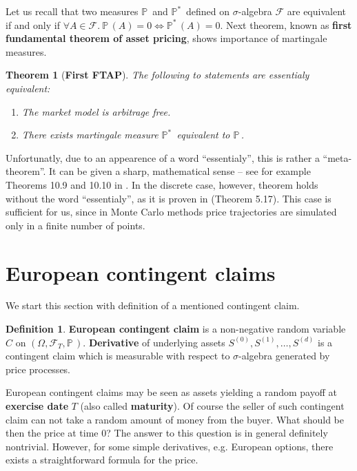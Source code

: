 \documentclass[a4paper,12pt, oneside]{book}
\newtheorem{thm}{Theorem}[chapter]
\theoremstyle{definition}
\newtheorem{mydef}{Definition}[chapter]
\theoremstyle{remark}
\def\P{{\mathbb{P}}\,}
\def\Pm{{\mathbb{P}}^*\,}
\begin{document}
Let us recall that two measures $\P$ and $\Pm$ defined on $\sigma$-algebra $\mathcal{F}$ are equivalent if and only if $\forall A \in \mathcal{F}.\ \P(A)=0 \Leftrightarrow \Pm(A)=0$. Next theorem, known as \textbf{first fundamental theorem of asset pricing}, shows importance of martingale measures.
\begin{thm}[\bfseries First FTAP]
 \label{thm:fftap}
 The following to statements are \emph{essentialy} equivalent:
 \begin{enumerate}
  \item The market model is arbitrage free.
  \item There exists martingale measure $\Pm$ equivalent to $\P$.
 \end{enumerate}
\end{thm}
Unfortunatly, due to an appearence of a word ``essentialy'', this is rather a ``meta-theorem''. It can be given a sharp, mathematical sense -- see for example Theorems 10.9 and 10.10 in \cite{bjork}. In the discrete case, however, theorem holds without the word ``essentialy'', as it is proven in \cite{follmer} (Theorem 5.17). This case is sufficient for us, since in Monte Carlo methods price trajectories are simulated only in a finite number of points.

\section{European contingent claims}
\label{sec:ECC}
We start this section with definition of a mentioned contingent claim.
\begin{mydef}
 \label{def:cc_eu}
 \textbf{European contingent claim} is a non-negative random variable $C$ on $(\Omega, \mathcal{F}_T, \P)$. \textbf{Derivative} of underlying assets $S^{(0)}, S^{(1)}, \ldots, S^{(d)}$ is a contingent claim which is measurable with respect to $\sigma$-algebra generated by price processes.
\end{mydef}
European contingent claims may be seen as assets yielding a random payoff at \textbf{exercise date} $T$ (also called \textbf{maturity}). Of course the seller of such contingent claim can not take a random amount of money from the buyer. What should be then the price at time $0$? The answer to this question is in general definitely nontrivial. However, for some simple derivatives, e.g. European options, there exists a straightforward formula for the price.
\end{document}
